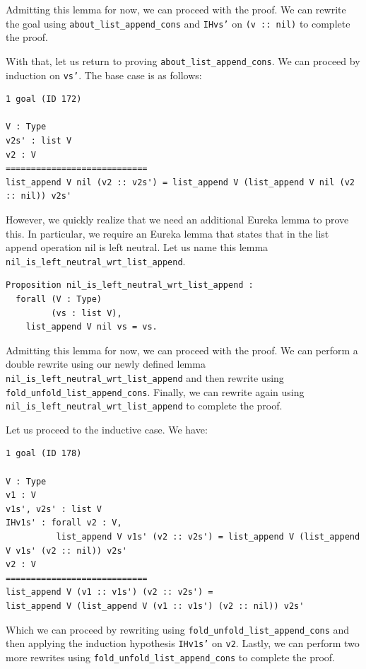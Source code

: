 \documentclass{article}
\begin{document}
Admitting this lemma for now, we can proceed with the proof. We can rewrite the goal using \texttt{about\_list\_append\_cons} and \texttt{IHvs'} on \texttt{(v :: nil)} to complete the proof.

With that, let us return to proving \texttt{about\_list\_append\_cons}. We can proceed by induction on \texttt{vs'}. The base case is as follows:

\begin{lstlisting}
1 goal (ID 172)

V : Type
v2s' : list V
v2 : V
============================
list_append V nil (v2 :: v2s') = list_append V (list_append V nil (v2 :: nil)) v2s'
\end{lstlisting}

However, we quickly realize that we need an additional Eureka lemma to prove this. In particular, we require an Eureka lemma that states that in the list append operation nil is left neutral. Let us name this lemma \texttt{nil\_is\_left\_neutral\_wrt\_list\_append}.

\begin{lstlisting}
Proposition nil_is_left_neutral_wrt_list_append :
  forall (V : Type)
         (vs : list V),
    list_append V nil vs = vs.
\end{lstlisting}

Admitting this lemma for now, we can proceed with the proof. We can perform a double rewrite using our newly defined lemma \texttt{nil\_is\_left\_neutral\_wrt\_list\_append} and then rewrite using \texttt{fold\_unfold\_list\_append\_cons}. Finally, we can rewrite again using \texttt{nil\_is\_left\_neutral\_wrt\_list\_append} to complete the proof.

Let us proceed to the inductive case. We have:

\begin{lstlisting}
1 goal (ID 178)

V : Type
v1 : V
v1s', v2s' : list V
IHv1s' : forall v2 : V,
          list_append V v1s' (v2 :: v2s') = list_append V (list_append V v1s' (v2 :: nil)) v2s'
v2 : V
============================
list_append V (v1 :: v1s') (v2 :: v2s') =
list_append V (list_append V (v1 :: v1s') (v2 :: nil)) v2s'
\end{lstlisting}

Which we can proceed by rewriting using \texttt{fold\_unfold\_list\_append\_cons} and then applying the induction hypothesis \texttt{IHv1s'} on \texttt{v2}. Lastly, we can perform two more rewrites using \texttt{fold\_unfold\_list\_append\_cons} to complete the proof.
\end{document}
